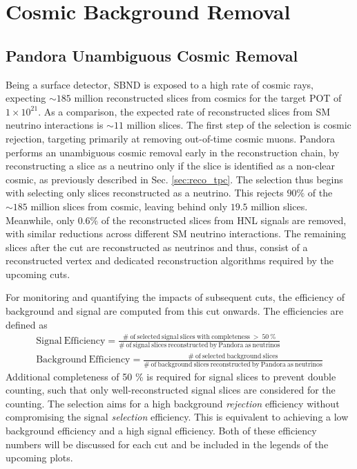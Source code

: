 
\section{Cosmic Background Removal}
\label{sec:cosmic_rej}

\subsection{Pandora Unambiguous Cosmic Removal}

Being a surface detector, SBND is exposed to a high rate of cosmic rays, expecting $\sim 185$ million reconstructed slices from cosmics for the target POT of $1 \times 10^{21}$.
As a comparison, the expected rate of reconstructed slices from SM neutrino interactions is $\sim 11$ million slices.
The first step of the selection is cosmic rejection, targeting primarily at removing out-of-time cosmic muons.
Pandora performs an unambiguous cosmic removal early in the reconstruction chain, by reconstructing a slice as a neutrino only if the slice is identified as a non-clear cosmic, as previously described in Sec. \ref{sec:reco_tpc}. 
The selection thus begins with selecting only slices reconstructed as a neutrino.
This rejects $90 \%$ of the $\sim 185$ million slices from cosmic, leaving behind only $19.5$ million slices.
Meanwhile, only $0.6 \%$ of the reconstructed slices from HNL signals are removed, with similar reductions across different SM neutrino interactions.  
The remaining slices after the cut are reconstructed as neutrinos and thus, consist of a reconstructed vertex and dedicated reconstruction algorithms required by the upcoming cuts.

For monitoring and quantifying the impacts of subsequent cuts, the efficiency of background and signal are computed from this cut onwards.
The efficiencies are defined as
\begin{align}
	\mathrm{Signal\ Efficiency = \frac{\#\ of\ selected\ signal\ slices\ with\ completeness\ >\ 50\ \%}{\#\ of\ signal\ slices\ reconstructed\ by\ Pandora\ as\ neutrinos}} \\
	\mathrm{Background\ Efficiency = \frac{\#\ of\ selected\ background\ slices}{\#\ of\ background\ slices\ reconstructed\ by\ Pandora\ as\ neutrinos}}
\end{align}
Additional completeness of 50 \% is required for signal slices to prevent double counting, such that only well-reconstructed signal slices are considered for the counting.                                    
The selection aims for a high background \textit{rejection} efficiency without compromising the signal \textit{selection} efficiency.                                                                             
This is equivalent to achieving a low background efficiency and a high signal efficiency.
Both of these efficiency numbers will be discussed for each cut and be included in the legends of the upcoming plots.                                                                                             



